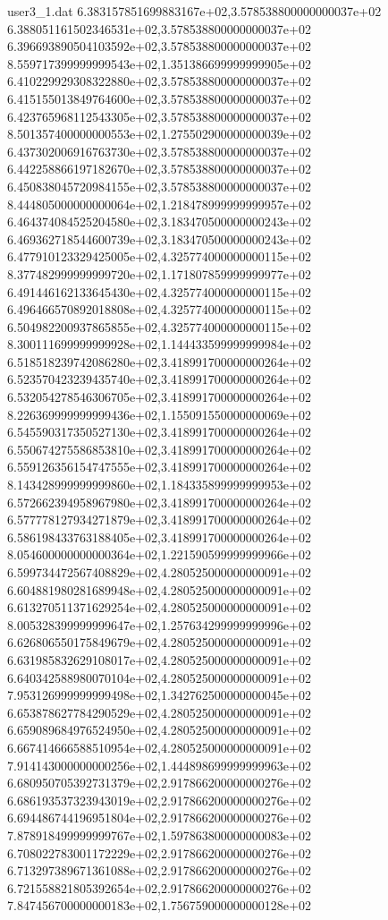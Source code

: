 \begin{filecontents}{user3_1.dat}
6.383157851699883167e+02,3.578538800000000037e+02
6.388051161502346531e+02,3.578538800000000037e+02
6.396693890504103592e+02,3.578538800000000037e+02
8.559717399999999543e+02,1.351386699999999905e+02
6.410229929308322880e+02,3.578538800000000037e+02
6.415155013849764600e+02,3.578538800000000037e+02
6.423765968112543305e+02,3.578538800000000037e+02
8.501357400000000553e+02,1.275502900000000039e+02
6.437302006916763730e+02,3.578538800000000037e+02
6.442258866197182670e+02,3.578538800000000037e+02
6.450838045720984155e+02,3.578538800000000037e+02
8.444805000000000064e+02,1.218478999999999957e+02
6.464374084525204580e+02,3.183470500000000243e+02
6.469362718544600739e+02,3.183470500000000243e+02
6.477910123329425005e+02,4.325774000000000115e+02
8.377482999999999720e+02,1.171807859999999977e+02
6.491446162133645430e+02,4.325774000000000115e+02
6.496466570892018808e+02,4.325774000000000115e+02
6.504982200937865855e+02,4.325774000000000115e+02
8.300111699999999928e+02,1.144433599999999984e+02
6.518518239742086280e+02,3.418991700000000264e+02
6.523570423239435740e+02,3.418991700000000264e+02
6.532054278546306705e+02,3.418991700000000264e+02
8.226369999999999436e+02,1.155091550000000069e+02
6.545590317350527130e+02,3.418991700000000264e+02
6.550674275586853810e+02,3.418991700000000264e+02
6.559126356154747555e+02,3.418991700000000264e+02
8.143428999999999860e+02,1.184335899999999953e+02
6.572662394958967980e+02,3.418991700000000264e+02
6.577778127934271879e+02,3.418991700000000264e+02
6.586198433763188405e+02,3.418991700000000264e+02
8.054600000000000364e+02,1.221590599999999966e+02
6.599734472567408829e+02,4.280525000000000091e+02
6.604881980281689948e+02,4.280525000000000091e+02
6.613270511371629254e+02,4.280525000000000091e+02
8.005328399999999647e+02,1.257634299999999996e+02
6.626806550175849679e+02,4.280525000000000091e+02
6.631985832629108017e+02,4.280525000000000091e+02
6.640342588980070104e+02,4.280525000000000091e+02
7.953126999999999498e+02,1.342762500000000045e+02
6.653878627784290529e+02,4.280525000000000091e+02
6.659089684976524950e+02,4.280525000000000091e+02
6.667414666588510954e+02,4.280525000000000091e+02
7.914143000000000256e+02,1.444898699999999963e+02
6.680950705392731379e+02,2.917866200000000276e+02
6.686193537323943019e+02,2.917866200000000276e+02
6.694486744196951804e+02,2.917866200000000276e+02
7.878918499999999767e+02,1.597863800000000083e+02
6.708022783001172229e+02,2.917866200000000276e+02
6.713297389671361088e+02,2.917866200000000276e+02
6.721558821805392654e+02,2.917866200000000276e+02
7.847456700000000183e+02,1.756759000000000128e+02

\end{filecontents}
